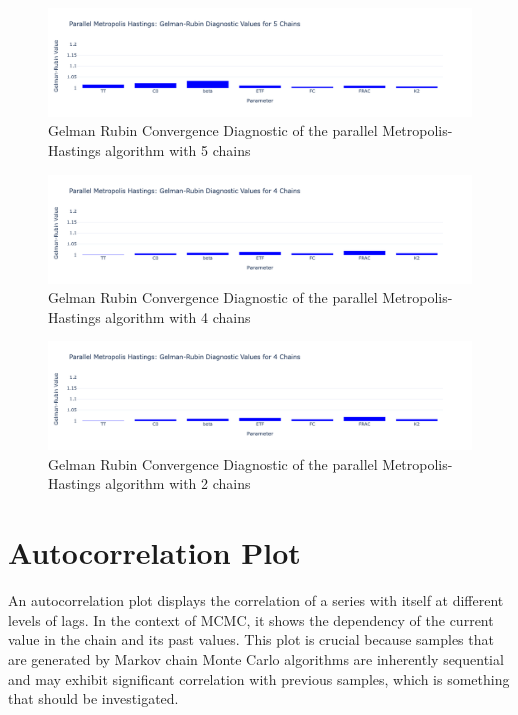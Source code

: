 \begin{figure}[H]
    \centering
    \includegraphics[width=1\textwidth]{figures/parallel_mh/GR_5.png}
    \captionsetup{width=.8\textwidth}
    \caption{Gelman Rubin Convergence Diagnostic of the parallel Metropolis-Hastings algorithm with 5 chains}
    \label{fig:enter-label}
\end{figure}

\begin{figure}[H]
    \centering
    \includegraphics[width=1\textwidth]{figures/parallel_mh/GR_4.png}
    \captionsetup{width=.8\textwidth}
    \caption{Gelman Rubin Convergence Diagnostic of the parallel Metropolis-Hastings algorithm with 4 chains}
    \label{fig:enter-label}
\end{figure}

\begin{figure}[H]
    \centering
    \includegraphics[width=1\textwidth]{figures/parallel_mh/GR_2.png}
    \captionsetup{width=.8\textwidth}
    \caption{Gelman Rubin Convergence Diagnostic of the parallel Metropolis-Hastings algorithm with 2 chains}
    \label{fig:enter-label}
\end{figure}



\section{Autocorrelation Plot}
An autocorrelation plot displays the correlation of a series with itself at different levels of lags. In the context of MCMC, it shows the dependency of the current value in the chain and its past values. This plot is crucial because samples that are generated by Markov chain Monte Carlo algorithms are inherently sequential and may exhibit significant correlation with previous samples, which is something that should be investigated. 

